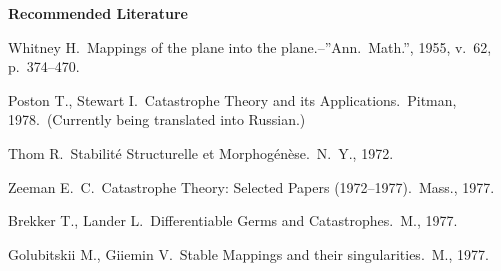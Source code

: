 \documentclass[12pt]{amsart}
\begin{document}
\noindent\textbf{Recommended Literature}

\noindent Whitney H.\ Mappings of the plane into the plane.--''Ann.\ Math.'',
1955, v.\ 62, p.\ 374--470.

\noindent Poston T., Stewart I.\ Catastrophe Theory and its
Applications.\ Pitman, 1978.\ (Currently being translated into Russian.)

\noindent Thom R.\ Stabilité Structurelle et Morphogénèse.\ N.\ Y., 1972.

\noindent Zeeman E.\ C.\ Catastrophe Theory: Selected Papers
(1972--1977).\ Mass., 1977.

\noindent Brekker T., Lander L.\ Differentiable Germs and Catastrophes.\ M.,
1977.

\noindent Golubitskii M., Giiemin V.\ Stable Mappings and their
singularities.\ M., 1977.
\end{document}
